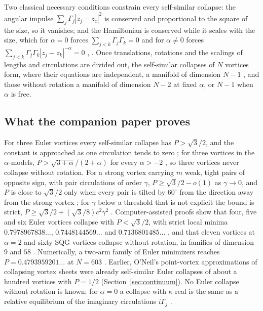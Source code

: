 \documentclass[11pt]{article}
\theoremstyle{definition}
\begin{document}
Two classical necessary conditions constrain every self-similar collapse: the angular impulse $\sum_j \Gamma_j |z_j - z_c|^2$ is conserved and proportional to the square of the size, so it vanishes; and the Hamiltonian is conserved while it scales with the size, which for $\alpha = 0$ forces $\sum_{j<k} \Gamma_j\Gamma_k = 0$ and for $\alpha \ne 0$ forces $\sum_{j<k} \Gamma_j\Gamma_k |z_j - z_k|^{-\alpha} = 0$ \cite[Sect.~2, Lemma~2, Sect.~7]{mw2026}, \cite{dk2014}. Once translations, rotations and the scalings of lengths and circulations are divided out, the self-similar collapses of $N$ vortices form, where their equations are independent, a manifold of dimension $N - 1$ \cite[Sect.~7]{mw2026}, and those without rotation a manifold of dimension $N - 2$ at fixed $\alpha$, or $N - 1$ when $\alpha$ is free.

\subsection{What the companion paper proves}

For three Euler vortices every self-similar collapse has $P > \sqrt{3}/2$, and the constant is approached as one circulation tends to zero \cite[Theorem~1, Corollary~1]{mw2026}; for three vortices in the $\alpha$-models, $P > \sqrt{3 + \alpha}/(2 + \alpha)$ for every $\alpha > -2$ \cite[Theorem~2]{mw2026}, so three vortices never collapse without rotation. For a strong vortex carrying $m$ weak, tight pairs of opposite sign, with pair circulations of order $\gamma$, $P \ge \sqrt{3}/2 - o(1)$ as $\gamma \to 0$, and $P$ is close to $\sqrt{3}/2$ only when every pair is tilted by $60^\circ$ from the direction away from the strong vortex \cite[Theorem~3]{mw2026}; for $\gamma$ below a threshold that is not explicit the bound is strict, $P \ge \sqrt{3}/2 + (\sqrt{3}/8)c^2\gamma^2$ \cite[Proposition~4]{mw2026}. Computer-assisted proofs show that four, five and six Euler vortices collapse with $P < \sqrt{3}/2$, with strict local minima $0.7978967838\ldots$, $0.7448144569\ldots$ and $0.7136801485\ldots$ \cite[Theorem~4]{mw2026}, and that eleven vortices at $\alpha = 2$ and sixty SQG vortices collapse without rotation, in families of dimension $9$ and $58$ \cite[Theorem~5]{mw2026}. Numerically, a two-arm family of Euler minimizers reaches $P = 0.4793959201\ldots$ at $N = 603$ \cite[Sect.~7]{mw2026}. Earlier, O'Neil's point-vortex approximations of collapsing vortex sheets \cite[Fig.~3]{oneil2010} were already self-similar Euler collapses of about a hundred vortices with $P = 1/2$ (Section~\ref{sec:continuum}). No Euler collapse without rotation is known; for $\alpha = 0$ a collapse with $\kappa$ real is the same as a relative equilibrium of the imaginary circulations $i\Gamma_j$ \cite[Sect.~10]{mw2026}.
\end{document}
